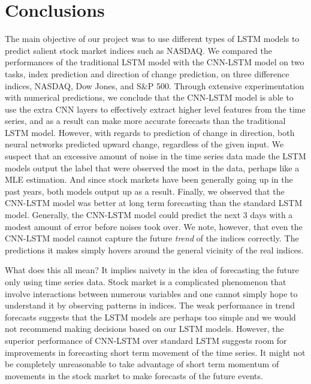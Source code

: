\documentclass[12pt]{article}
\begin{document}
\section{Conclusions}

The main objective of our project was to use different types of LSTM models to predict salient stock market indices such as NASDAQ. We compared the performances of the traditional LSTM model with the CNN-LSTM model on two tasks, index prediction and direction of change prediction, on three difference indices, NASDAQ, Dow Jones, and S\&P 500.
Through extensive experimentation with numerical predictions, we conclude that the CNN-LSTM model is able to use the extra CNN layers to effectively extract higher level features from the time series, and as a result can make more accurate forecasts than the traditional LSTM model. However, with regards to prediction of change in direction, both neural networks predicted upward change, regardless of the given input. We suspect that an excessive amount of noise in the time series data made the LSTM models output the label that were observed the most in the data, perhaps like a MLE estimation. And since stock markets have been generally going up in the past years, both models output up as a result. Finally, we observed that the CNN-LSTM model was better at long term forecasting than the standard LSTM model. Generally, the CNN-LSTM model could predict the next 3 days with a modest amount of error before noises took over. We note, however, that even the CNN-LSTM model cannot capture the future \textit{trend} of the indices correctly. The predictions it makes simply hovers around the general vicinity of the real indices.

What does this all mean? It implies naivety in the idea of forecasting the future only using time series data. Stock market is a complicated phenomenon that involve interactions between numerous variables and one cannot simply hope to understand it by observing patterns in indices. The weak performance in trend forecasts suggests that the LSTM models are perhaps too simple and we would not recommend making decisions based on our LSTM models. However, the superior performance of CNN-LSTM over standard LSTM suggests room for improvements in forecasting short term movement of the time series. It might not be completely unreasonable to take advantage of short term momentum of movements in the stock market to make forecasts of the future events.
\end{document}
